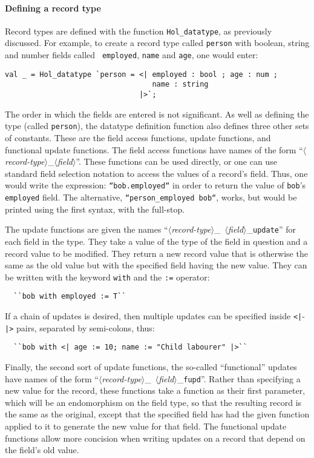 \paragraph{Defining a record type}
Record types are defined with the function \texttt{Hol\_datatype}, as
previously discussed.  For example, to create a record type called
{\tt person} with boolean, string and number fields called {\tt
  employed}, {\tt name} and {\tt age}, one would enter:
\begin{verbatim}
val _ = Hol_datatype `person = <| employed : bool ; age : num ;
                                  name : string
                               |>`;
\end{verbatim}
The order in which the fields are entered is not significant. As well
as defining the type (called {\tt person}), the datatype definition
function also defines three other sets of constants.  These are the
field access functions, update functions, and functional update
functions.  The field access functions have names of the form
``$\langle$\textsl{record-type\/}$\rangle$\_$\langle$\textsl{field\/}$\rangle$''.
These functions can be used directly, or one can use standard field
selection notation to access the values of a record's field.  Thus,
one would write the expression: \mbox{\tt ``bob.employed``} in order
to return the value of {\tt bob}'s {\tt employed} field.  The
alternative, \texttt{``person\_employed bob``}, works, but would be
printed using the first syntax, with the full-stop.

The update functions are given the names
\mbox{``$\langle$\textsl{record-type\/}$\rangle$\_%
$\langle$\textsl{field\/}$\rangle$\_\texttt{update}''} for each
field in the type.  They take a value of the type of the field in
question and a record value to be modified.  They return a new record
value that is otherwise the same as the old value but with the
specified field having the new value.  They can be written with the
keyword \texttt{with} and the \texttt{:=} operator:
\begin{verbatim}
  ``bob with employed := T``
\end{verbatim}
\noindent If a chain of updates is desired, then multiple updates can
be specified inside \texttt{<|}-\texttt{|>} pairs, separated by
semi-colons, thus:

\begin{verbatim}
  ``bob with <| age := 10; name := "Child labourer" |>``
\end{verbatim}

\noindent Finally, the second sort of update functions, the so-called
``functional'' updates have names of the form
\mbox{``$\langle$\textsl{record-type\/}$\rangle$\_%
$\langle$\textsl{field\/}$\rangle$\_\texttt{fupd}''}. Rather than
specifying a new value for the record, these functions take a function
as their first parameter, which will be an endomorphism on the field
type, so that the resulting record is the same as the original, except
that the specified field has had the given function applied to it to
generate the new value for that field.  The functional update
functions allow more concision when writing updates on a record that
depend on the field's old value.

